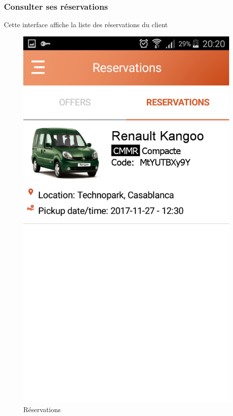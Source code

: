 \documentclass[12pt,a4paper]{report}
\begin{document}
	\subsubsection{Consulter ses réservations}
Cette interface affiche la liste des réservations du client
	\vspace{2cm}
	\begin{figure}[!hbtp]
		\centering
		\includegraphics[scale=0.2]{./graphics/Reservations.png}
		\caption{Réservations}
		\end{figure}
		\newpage
\end{document}
